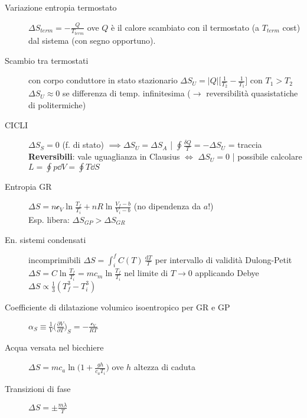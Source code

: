 \documentclass[10pt, oneside]{article}
\begin{document}
\begin{description}
\item[Variazione entropia termostato] $\displaystyle \Delta S_{term} = - \frac{Q}{T_{term}}$ ove $Q$ è il calore scambiato con il termostato (a $T_{term}$ cost) dal sistema (con segno opportuno).
\item[Scambio tra termostati] con corpo conduttore in stato stazionario $\displaystyle \Delta S_U = |Q| \bigg[\frac{1}{T_2} - \frac{1}{T_1}\bigg]$ con $T_1 > T_2$ \\$\Delta S_U \approx 0$ se differenza di temp. infinitesima ($\rightarrow$ reversibilità quasistatiche di politermiche)
\item[CICLI] $\displaystyle \Delta S_S = 0$ (f. di stato) $\displaystyle \implies \Delta S_U = \Delta S_A$ \hfill \bigg| \hfill $\displaystyle \oint \frac{\delta Q}{T} = - \Delta S_U$ = traccia
\\\textbf{Reversibili}: vale uguaglianza in Clausius $\Leftrightarrow$ $\displaystyle \Delta S_U = 0$ \hfill \bigg| \hfill possibile calcolare $\displaystyle L = \oint p \dd{V} = \oint T \dd{S}$
\end{description}
\begin{description}
\item[Entropia GR] $\displaystyle \Delta S = n \mathcal{c}_V \ln \frac{T_f}{T_i} + nR \ln \frac{V_f - b}{V_i - b}$ (no dipendenza da $a$!)
\\Esp. libera: $\Delta S_{GP} > \Delta S_{GR}$
\item[En. sistemi condensati] incomprimibili $\displaystyle \Delta S = \int_i^f C(T) \,\frac{\mathrm{d}T}{T}$ per intervallo di validità Dulong-Petit $\displaystyle \Delta S = C \ln \frac{T_f}{T_i} = m c_m \ln \frac{T_f}{T_i}$ nel limite di $T \rightarrow 0$ applicando Debye $\displaystyle \Delta S \propto \frac{1}{3} (T_f^3 - T_i^3)$
\item[Coefficiente di dilatazione volumico isoentropico per GR e GP] $\displaystyle \alpha_S \equiv \frac{1}{V} \bigg(\frac{\partial V}{\partial T}\bigg)_S = - \frac{\mathcal{c}_V}{RT}$
\item[Acqua versata nel bicchiere] $\displaystyle \Delta S = m c_a \ln \bigg( 1 + \frac{gh}{c_a T_i} \bigg)$ ove $h$ altezza di caduta
\item[Transizioni di fase] $\displaystyle \Delta S = \pm \frac{m \lambda}{T}$
\end{description}
\end{document}

